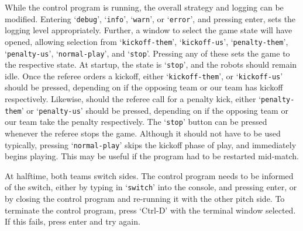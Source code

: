 While the control program is running, the overall strategy and logging can be
modified. Entering `\texttt{debug}', `\texttt{info}', `\texttt{warn}', or
`\texttt{error}', and pressing enter, sets the logging level appropriately.
Further, a window to select the game state will have opened, allowing selection
from `\texttt{kickoff-them}', `\texttt{kickoff-us}', `\texttt{penalty-them}',
`\texttt{penalty-us}', `\texttt{normal-play}', and `\texttt{stop}'. Pressing
any of these sets the game to the respective state. At startup, the state is
`\texttt{stop}', and the robots should remain idle. Once the referee orders a
kickoff, either `\texttt{kickoff-them}', or `\texttt{kickoff-us}' should be
pressed, depending on if the opposing team or our team has kickoff
respectively. Likewise, should the referee call for a penalty kick, either
`\texttt{penalty-them}' or `\texttt{penalty-us}' should be pressed, depending
on if the opposing team or our team take the penalty respectively. The
`\texttt{stop}' button can be pressed whenever the referee stops the game.
Although it should not have to be used typically, pressing
`\texttt{normal-play}' skips the kickoff phase of play, and immediately begins
playing. This may be useful if the program had to be restarted mid-match.

At halftime, both teams switch sides. The control program needs to be informed
of the switch, either by typing in `\texttt{switch}' into the console, and
pressing enter, or by closing the control program and re-running it with the
other pitch side. To terminate the control program, press `Ctrl-D' with the
terminal window selected. If this fails, press enter and try again.
